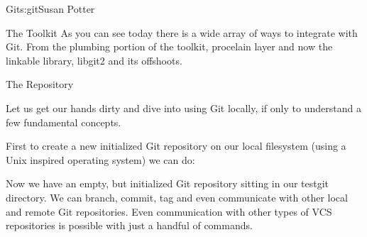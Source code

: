 \begin{aosachapter}{Git}{s:git}{Susan Potter}
\begin{aosasect1}{The Toolkit}
As you can see today there is a wide array of ways to integrate with Git.
From the plumbing portion of the toolkit, procelain layer and now the
linkable library, libgit2 and its offshoots.
\end{aosasect1}

\begin{aosasect1}{The Repository}

Let us get our hands dirty and dive into using Git locally, if only to
understand a few fundamental concepts.

First to create a new initialized Git repository on our local filesystem
(using a Unix inspired operating system) we can do:
\begin{aosaitemize}
  \item {}
  \item {}
  \item {}
\end{aosaitemize}

Now we have an empty, but initialized Git repository sitting in our testgit
directory. We can branch, commit, tag and even communicate with other local
and remote Git repositories. Even communication with other types of VCS
repositories is possible with just a handful of  commands.


\end{aosasect1}
\end{aosachapter}

